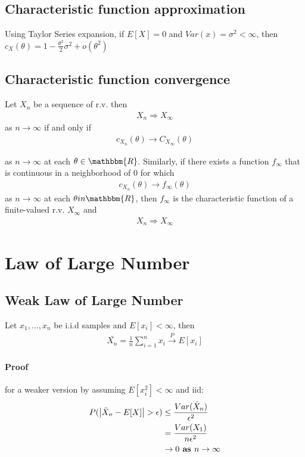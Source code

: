 \subsection{Characteristic function approximation}
Using Taylor Series expansion, if $E[X]=0$ and $Var(x) = \sigma^2 < \infty$, then $c_X(\theta) = 1 - \frac{\theta^2}{2} \sigma^2 + o(\theta^2)$

\subsection{Characteristic function convergence}
Let $X_n$ be a sequence of r.v. then 
    \begin{align*}
        X_n \Rightarrow X_\infty \tag{Convergence in distribution} 
    \end{align*}
as $n \to \infty$ if and only if 
    \begin{align*}
        c_{X_n}(\theta) \to C_{X_\infty}(\theta) \tag{Convergence that is not related to randomness}
    \end{align*}

as $n\to \infty$ at each $\theta \in \mathbbm{R}$. Similarly, if there exists a function $f_\infty$ that is continuous in a neighborhood of $0$ for which 
    \begin{align*}
        c_{X_n}(\theta) \to f_{\infty}(\theta)
    \end{align*}
as $n \to \infty$ at each $\theta in \mathbbm{R}$, then $f_\infty$ is the characteristic function of a finite-valued r.v. $X_\infty$ and  
    \begin{align*}
        X_n \Rightarrow X_\infty
    \end{align*}
    
    
\section{Law of Large Number}
\subsection{Weak Law of Large Number}
Let $x_1, ..., x_n$ be i.i.d samples and $E[x_i] < \infty$, then 
    \begin{align*}
        \bar{X_n} = \frac{1}{n}\sum_{i=1}^n x_i \overset{P}{\to} E[x_i]
    \end{align*}

\paragraph{Proof} for a weaker version by assuming $E[x_i^2] < \infty$ and iid:
\begin{align*}
    P(\left| \bar{X}_n - E[X] \right| > \epsilon)
    & \leq \frac{Var(\bar{X}_n)}{\epsilon^2} \\
    & = \frac{Var(X_1)}{n \epsilon^2} \\
    & \to 0 \textbf{ as } n \to \infty
\end{align*}


